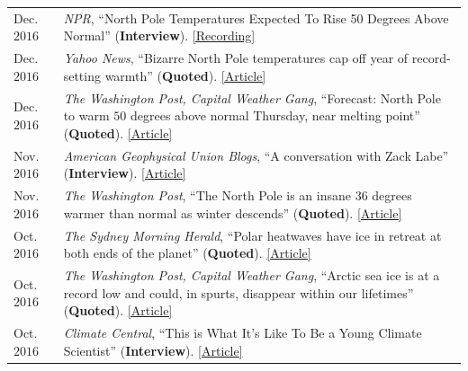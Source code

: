 \documentclass[margin,line,palatino,courier,10pt]{res}
\begin{document}
\begin{resume}
\begin{tabular}{@{}p{0.8in}p{4in}}
Dec. $2016$ & \textit{NPR}, ``North Pole Temperatures Expected To Rise 50 Degrees Above Normal'' (\textbf{Interview}). \href{http://www.npr.org/2016/12/21/506483966/north-pole-temperatures-expected-to-rise-50-degrees-above-normal}{[Recording]}\\
Dec. $2016$ & \textit{Yahoo News}, ``Bizarre North Pole temperatures cap off year of record-setting warmth'' (\textbf{Quoted}). \href{https://www.yahoo.com/news/bizarre-north-pole-temperatures-cap-off-year-of-record-setting-warmth-181727978.html?soc_src=social-sh&soc_trk=tw}{[Article]}\\
Dec. $2016$ & \textit{The Washington Post, Capital Weather Gang}, ``Forecast: North Pole to warm $50$ degrees above normal Thursday, near melting point'' (\textbf{Quoted}). \href{https://www.washingtonpost.com/news/capital-weather-gang/wp/2016/12/20/forecast-north-pole-to-warm-50-degrees-above-normal-thursday-near-melting-point/?dfgdfgdfgdfg&utm_term=.e648369ada7e}{[Article]}\\
Nov. $2016$ & \textit{American Geophysical Union Blogs}, ``A conversation with Zack Labe'' (\textbf{Interview}). \href{http://blogs.agu.org/mountainbeltway/2016/11/23/conversation-zack-labe/}{[Article]}\\
Nov. $2016$ & \textit{The Washington Post}, ``The North Pole is an insane 36 degrees warmer than normal as winter descends'' (\textbf{Quoted}). \href{https://www.washingtonpost.com/news/energy-environment/wp/2016/11/17/the-north-pole-is-an-insane-36-degrees-warmer-than-normal-as-winter-descends/?utm_term=.f2cb9596b3d8}{[Article]}\\
Oct. $2016$ & \textit{The Sydney Morning Herald}, ``Polar heatwaves have ice in retreat at both ends of the planet'' (\textbf{Quoted}). \href{http://www.smh.com.au/environment/climate-change/polar-heatwaves-have-ice-in-retreat-at-both-ends-of-the-planet-20161030-gse9q6.html}{[Article]}\\
Oct. $2016$ & \textit{The Washington Post, Capital Weather Gang}, ``Arctic sea ice is at a record low and could, in spurts, disappear within our lifetimes'' (\textbf{Quoted}). \href{https://www.washingtonpost.com/news/capital-weather-gang/wp/2016/10/27/arctic-sea-ice-is-at-a-record-low-and-could-in-spurts-disappear-within-our-lifetimes/}{[Article]}\\
Oct. $2016$ & \textit{Climate Central}, ``This is What It's Like To Be a Young Climate Scientist'' (\textbf{Interview}). \href{http://www.climatecentral.org/news/young-climate-scientists-interviews-20799}{[Article]}\\

\end{tabular}
\end{resume}
\end{document}
